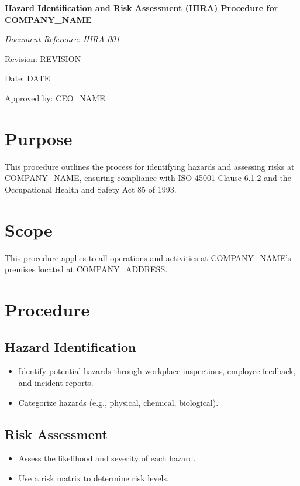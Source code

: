 \documentclass[12pt]{article}
\begin{document}
\begin{titlepage}
    \centering
    \vspace*{2cm}
    {\LARGE\bfseries Hazard Identification and Risk Assessment (HIRA) Procedure for {{COMPANY_NAME}}\par}
    \vspace{1cm}
    {\large\itshape Document Reference: HIRA-001\par}
    \vspace{0.5cm}
    {\normalsize Revision: {{REVISION}}\par}
    \vspace{0.5cm}
    {\normalsize Date: {{DATE}}\par}
    \vspace{2cm}
    {\normalsize Approved by: {{CEO_NAME}}\par}
\end{titlepage}

\section{Purpose}
This procedure outlines the process for identifying hazards and assessing risks at {{COMPANY_NAME}}, ensuring compliance with ISO 45001 Clause 6.1.2 and the Occupational Health and Safety Act 85 of 1993.

\section{Scope}
This procedure applies to all operations and activities at {{COMPANY_NAME}}'s premises located at {{COMPANY_ADDRESS}}.

\section{Procedure}
\subsection{Hazard Identification}
\begin{itemize}
    \item Identify potential hazards through workplace inspections, employee feedback, and incident reports.
    \item Categorize hazards (e.g., physical, chemical, biological).
\end{itemize}

\subsection{Risk Assessment}
\begin{itemize}
    \item Assess the likelihood and severity of each hazard.
    \item Use a risk matrix to determine risk levels.
\end{itemize}
\end{document}
